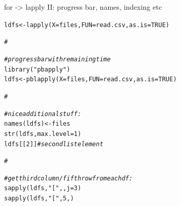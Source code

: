 \documentclass[xcolor=table,      handout ,    xcolor=dvipsnames]{beamer}\usepackage[]{graphicx}\usepackage[]{color}
\makeatletter
\newcommand{\hlnum}[1]{\textcolor[rgb]{0,0,0}{#1}}
\newcommand{\hlstr}[1]{\textcolor[rgb]{0.545,0.137,0.137}{#1}}
\newcommand{\hlcom}[1]{\textcolor[rgb]{0,0.392,0}{\textit{#1}}}
\newcommand{\hlstd}[1]{\textcolor[rgb]{0,0,0}{#1}}
\newcommand{\hlkwb}[1]{\textcolor[rgb]{0,0,0}{#1}}
\newcommand{\hlkwc}[1]{\textcolor[rgb]{1,0,1}{#1}}
\newcommand{\hlkwd}[1]{\textcolor[rgb]{0,0,1}{#1}}
\newenvironment{kframe}{%
 \def\at@end@of@kframe{}%
 \ifinner\ifhmode%
  \def\at@end@of@kframe{\end{minipage}}%
  \begin{minipage}{\columnwidth}%
 \fi\fi%
 \def\FrameCommand##1{\hskip\@totalleftmargin \hskip-\fboxsep
 \colorbox{shadecolor}{##1}\hskip-\fboxsep
     \hskip-\linewidth \hskip-\@totalleftmargin \hskip\columnwidth}%
 \MakeFramed {\advance\hsize-\width
   \@totalleftmargin\z@ \linewidth\hsize
   \@setminipage}}%
 {\par\unskip\endMakeFramed%
 \at@end@of@kframe}
\newenvironment{knitrout}{}{} %
\makeatother
\begin{document}
\begin{frame}[fragile]{for -> lapply II: progress bar, names, indexing etc}
\vspace{-0.6em}
\begin{knitrout}
\color{fgcolor}\begin{kframe}
\begin{alltt}
\hlstd{ldfs} \hlkwb{<-}   \hlkwd{lapply}\hlstd{(}\hlkwc{X}\hlstd{=files,} \hlkwc{FUN}\hlstd{=read.csv,} \hlkwc{as.is}\hlstd{=}\hlnum{TRUE}\hlstd{)}

\hlcom{#}
\end{alltt}
\end{kframe}
\end{knitrout}
\pause \vspace{-3.48em}
\begin{knitrout}
\color{fgcolor}\begin{kframe}
\begin{alltt}
\hlcom{# progress bar with remaining time}
\hlkwd{library}\hlstd{(}\hlstr{"pbapply"}\hlstd{)}
\hlstd{ldfs} \hlkwb{<-} \hlkwd{pblapply}\hlstd{(}\hlkwc{X}\hlstd{=files,} \hlkwc{FUN}\hlstd{=read.csv,} \hlkwc{as.is}\hlstd{=}\hlnum{TRUE}\hlstd{)}

\hlcom{#}
\end{alltt}
\end{kframe}
\end{knitrout}
\pause \vspace{-3.48em}
\begin{knitrout}
\color{fgcolor}\begin{kframe}
\begin{alltt}
\hlcom{# nice additional stuff:}
\hlkwd{names}\hlstd{(ldfs)} \hlkwb{<-} \hlstd{files}
\hlkwd{str}\hlstd{(ldfs,} \hlkwc{max.level}\hlstd{=}\hlnum{1}\hlstd{)}
\hlstd{ldfs[[}\hlnum{2}\hlstd{]]} \hlcom{# second list element}

\hlcom{#}
\end{alltt}
\end{kframe}
\end{knitrout}
\pause \vspace{-3.58em}
\begin{knitrout}
\color{fgcolor}\begin{kframe}
\begin{alltt}
\hlcom{# get third column / fifth row from each df:}
\hlkwd{sapply}\hlstd{(ldfs,} \hlstr{"["}\hlstd{,  ,} \hlkwc{j}\hlstd{=}\hlnum{3}\hlstd{)}
\hlkwd{sapply}\hlstd{(ldfs,} \hlstr{"["}\hlstd{,} \hlnum{5}\hlstd{,    )}
\end{alltt}
\end{kframe}
\end{knitrout}
\end{frame}
\end{document}
